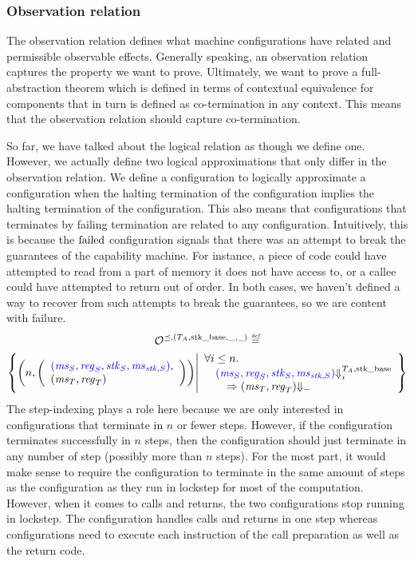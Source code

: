 \begin{jversion}
\subsubsection{Observation relation}
The observation relation defines what machine configurations have related and permissible observable effects.
Generally speaking, an observation relation captures the property we want to prove.
Ultimately, we want to prove a full-abstraction theorem which is defined in terms of contextual equivalence for components that in turn is defined as co-termination in any context.
This means that the observation relation should capture co-termination.

So far, we have talked about the logical relation as though we define one.
However, we actually define two logical approximations that only differ in the observation relation.
We define a \srccm{} configuration to logically approximate a \trgcm{} configuration when the halting termination of the \srccm{} configuration implies the halting termination of the \trgcm{} configuration.
This also means that \srccm{} configurations that terminates by failing termination are related to any \trgcm{} configuration.
Intuitively, this is because the $\mathrm{failed}$ configuration signals that there was an attempt to break the guarantees of the capability machine.
For instance, a piece of code could have attempted to read from a part of memory it does not have access to, or a callee could have attempted to return out of order.
In both cases, we haven't defined a way to recover from such attempts to break the guarantees, so we are content with failure.
\begin{multline*}
  \lro[\preceq,(\ta,\stkb,\_,\_)] \defeq \\\left\{ \npair{\left(\array{l}\src{(\ms_S,\reg_S,\stk_S,\ms_{\stk,S})},\\(\ms_T,\reg_T)\endarray\right)} \middle|
    \begin{array}{l}
      \forall i \leq n \ldotp \\
      \quad \src{(\ms_S,\reg_S,\stk_S,\ms_{\stk,S})} \sterm[i]{\ta,\stkb} \\\qquad\Rightarrow (\ms_T,\reg_T) \term\\
    \end{array}
\right\}
\end{multline*}
The step-indexing plays a role here because we are only interested in \srccm{} configurations that terminate in $n$ or fewer steps.
However, if the \srccm{} configuration terminates successfully in $n$ steps, then the \trgcm{} configuration should just terminate in any number of step (possibly more than $n$ steps).
For the most part, it would make sense to require the \trgcm{} configuration to terminate in the same amount of steps as the \srccm{} configuration as they run in lockstep for most of the computation.
However, when it comes to calls and returns, the two configurations stop running in lockstep.
The \srccm{} configuration handles calls and returns in one step whereas \trgcm{} configurations need to execute each instruction of the call preparation as well as the return code.


\end{jversion}
